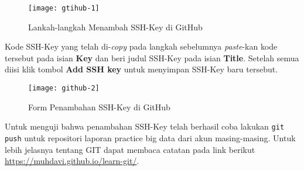 \documentclass[a4paper]{tufte-handout}
\begin{document}
\begin{enumerate}
\begin{figure}[!ht]
\centering
\texttt{[image: gtihub-1]}
\caption{Lankah-langkah Menambah SSH-Key di GitHub}
\label{gam:langkah-ssh}
\end{figure}

Kode SSH-Key yang telah di-\textit{copy} pada langkah sebelumnya \textit{paste}-kan kode tersebut pada isian \textbf{Key} dan beri judul SSH-Key pada isian \textbf{Title}. Setelah semua diisi klik tombol \textbf{Add SSH key} untuk menyimpan SSH-Key baru tersebut.

\begin{figure}[!ht]
\centering
\texttt{[image: github-2]}
\caption{Form Penambahan SSH-Key di GitHub}
\label{gam:tambah-ssh}
\end{figure}

Untuk menguji bahwa penambahan SSH-Key telah berhasil coba lakukan {\tt git push} untuk repositori laporan practice big data dari akun masing-masing. Untuk lebih jelasnya tentang GIT dapat membaca catatan pada link berikut \url{https://muhdavi.github.io/learn-git/}.
\end{enumerate}

\hrulefill
\end{document}

